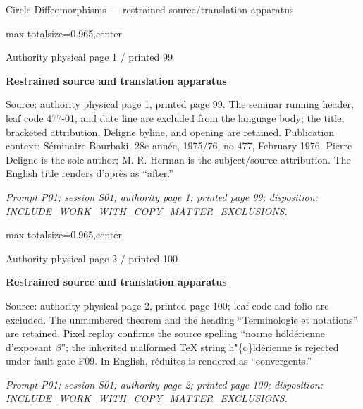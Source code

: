 \documentclass{article}
\begin{document}
\fontsize{8.35}{9.55}\selectfont
\begin{center}\scriptsize Circle Diffeomorphisms --- restrained source/translation apparatus\end{center}

\noindent\begin{adjustbox}{max totalsize={\textwidth}{0.965\textheight},center}\begin{minipage}{\textwidth}
\noindent\hfill\scriptsize Authority physical page 1 / printed 99\par\normalsize
\textbf{Restrained source and translation apparatus}\par
Source: authority physical page 1, printed page 99. The seminar running header, leaf code 477-01, and date line are excluded from the language body; the title, bracketed attribution, Deligne byline, and opening are retained. Publication context: Séminaire Bourbaki, 28e année, 1975/76, no 477, February 1976. Pierre Deligne is the sole author; M. R. Herman is the subject/source attribution. The English title renders d’après as “after.”
\par\smallskip
\textit{Prompt P01; session S01; authority page 1; printed page 99; disposition: INCLUDE\_WORK\_WITH\_COPY\_MATTER\_EXCLUSIONS.}
\end{minipage}\end{adjustbox}

\newpage
\noindent\begin{adjustbox}{max totalsize={\textwidth}{0.965\textheight},center}\begin{minipage}{\textwidth}
\noindent\hfill\scriptsize Authority physical page 2 / printed 100\par\normalsize
\textbf{Restrained source and translation apparatus}\par
Source: authority physical page 2, printed page 100; leaf code and folio are excluded. The unnumbered theorem and the heading “Terminologie et notations” are retained. Pixel replay confirms the source spelling “norme höldérienne d’exposant \ensuremath{\beta}”; the inherited malformed TeX string h"\{o\}ldérienne is rejected under fault gate F09. In English, réduites is rendered as “convergents.”
\par\smallskip
\textit{Prompt P01; session S01; authority page 2; printed page 100; disposition: INCLUDE\_WORK\_WITH\_COPY\_MATTER\_EXCLUSIONS.}
\end{minipage}\end{adjustbox}
\end{document}
